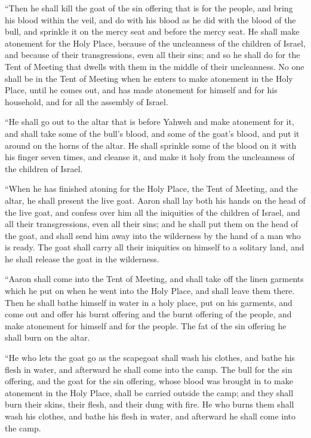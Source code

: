  ``Then he shall kill the goat of the sin offering that is
for the people, and bring his blood within the veil, and do with his
blood as he did with the blood of the bull, and sprinkle it on the mercy
seat and before the mercy seat.  He shall make atonement
for the Holy Place, because of the uncleanness of the children of
Israel, and because of their transgressions, even all their sins; and so
he shall do for the Tent of Meeting that dwells with them in the middle
of their uncleanness.  No one shall be in the Tent of
Meeting when he enters to make atonement in the Holy Place, until he
comes out, and has made atonement for himself and for his household, and
for all the assembly of Israel.

 ``He shall go out to the altar that is before Yahweh and
make atonement for it, and shall take some of the bull's blood, and some
of the goat's blood, and put it around on the horns of the altar.
 He shall sprinkle some of the blood on it with his finger
seven times, and cleanse it, and make it holy from the uncleanness of
the children of Israel.

 ``When he has finished atoning for the Holy Place, the
Tent of Meeting, and the altar, he shall present the live goat.
 Aaron shall lay both his hands on the head of the live
goat, and confess over him all the iniquities of the children of Israel,
and all their transgressions, even all their sins; and he shall put them
on the head of the goat, and shall send him away into the wilderness by
the hand of a man who is ready.  The goat shall carry all
their iniquities on himself to a solitary land, and he shall release the
goat in the wilderness.

 ``Aaron shall come into the Tent of Meeting, and shall
take off the linen garments which he put on when he went into the Holy
Place, and shall leave them there.  Then he shall bathe
himself in water in a holy place, put on his garments, and come out and
offer his burnt offering and the burnt offering of the people, and make
atonement for himself and for the people.  The fat of the
sin offering he shall burn on the altar.

 ``He who lets the goat go as the scapegoat shall wash his
clothes, and bathe his flesh in water, and afterward he shall come into
the camp.  The bull for the sin offering, and the goat for
the sin offering, whose blood was brought in to make atonement in the
Holy Place, shall be carried outside the camp; and they shall burn their
skins, their flesh, and their dung with fire.  He who burns
them shall wash his clothes, and bathe his flesh in water, and afterward
he shall come into the camp.

